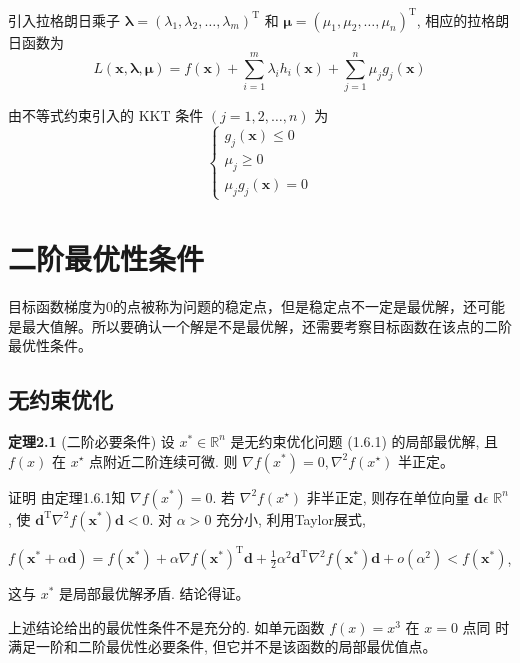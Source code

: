 引入拉格朗日乘子 $\boldsymbol{\lambda}=\left(\lambda_{1}, \lambda_{2}, \ldots, \lambda_{m}\right)^{\mathrm{T}}$ 和 $\boldsymbol{\mu}=\left(\mu_{1}, \mu_{2}, \ldots, \mu_{n}\right)^{\mathrm{T}}$, 相应的拉格朗日函数为
$$
L(\boldsymbol{x}, \boldsymbol{\lambda}, \boldsymbol{\mu})=f(\boldsymbol{x})+\sum_{i=1}^{m} \lambda_{i} h_{i}(\boldsymbol{x})+\sum_{j=1}^{n} \mu_{j} g_{j}(\boldsymbol{x})
$$

由不等式约束引入的 KKT 条件 $(j=1,2, \ldots, n)$ 为
$$
\left\{\begin{array}{l}
g_{j}(\boldsymbol{x}) \leqslant 0 \\
\mu_{j} \geqslant 0 \\
\mu_{j} g_{j}(\boldsymbol{x})=0
\end{array}\right.
$$

\section{二阶最优性条件}
目标函数梯度为0的点被称为问题的稳定点，但是稳定点不一定是最优解，还可能是最大值解。所以要确认一个解是不是最优解，还需要考察目标函数在该点的二阶最优性条件。

\subsection{无约束优化}
\textbf{定理2.1} (二阶必要条件) 设 $x^{*} \in \mathbb{R}^{n}$ 是无约束优化问题 (1.6.1) 的局部最优解, 且 $f(x)$ 在 $x^{\star}$ 点附近二阶连续可微. 则 $\nabla f\left(x^{*}\right)=0, \nabla^{2} f\left(x^{\star}\right)$ 半正定。

证明 由定理1.6.1知 $\nabla f\left(x^{*}\right)=0$. 若 $\nabla^{2} f\left(x^{\star}\right)$ 非半正定, 则存在单位向量 $\boldsymbol{d} \epsilon$ $\mathbb{R}^{n}$, 使 $\boldsymbol{d}^{\mathrm{T}} \nabla^{2} f\left(\boldsymbol{x}^{*}\right) \boldsymbol{d}<0$. 对 $\alpha>0$ 充分小, 利用Taylor展式,

$f\left(\boldsymbol{x}^{*}+\alpha \boldsymbol{d}\right)=f\left(\boldsymbol{x}^{*}\right)+\alpha \nabla f\left(\boldsymbol{x}^{*}\right)^{\mathrm{T}} \boldsymbol{d}+\frac{1}{2} \alpha^{2} \boldsymbol{d}^{\mathrm{T}} \nabla^{2} f\left(\boldsymbol{x}^{*}\right) \boldsymbol{d}+o\left(\alpha^{2}\right)<f\left(\boldsymbol{x}^{*}\right)$,

这与 $x^{*}$ 是局部最优解矛盾. 结论得证。

上述结论给出的最优性条件不是充分的. 如单元函数 $f(x)=x^{3}$ 在 $x=0$ 点同 时满足一阶和二阶最优性必要条件, 但它并不是该函数的局部最优值点。

